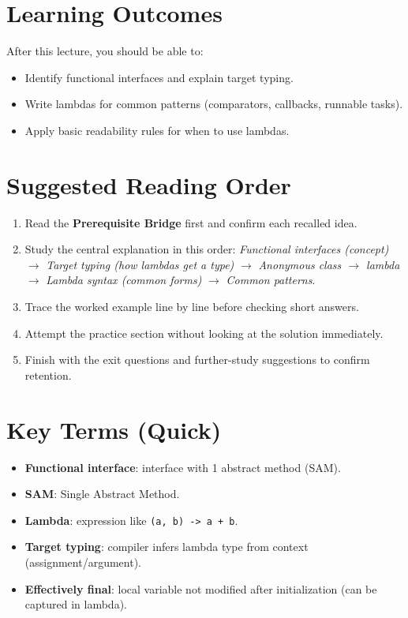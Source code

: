 \documentclass[11pt]{article}
\begin{document}
\section{Learning Outcomes}
After this lecture, you should be able to:
\begin{itemize}
  \item Identify functional interfaces and explain target typing.
  \item Write lambdas for common patterns (comparators, callbacks, runnable tasks).
  \item Apply basic readability rules for when to use lambdas.
\end{itemize}

\section{Suggested Reading Order}
\begin{enumerate}
  \item Read the \textbf{Prerequisite Bridge} first and confirm each recalled idea.
  \item Study the central explanation in this order: \textit{Functional interfaces (concept)} $\rightarrow$ \textit{Target typing (how lambdas get a type)} $\rightarrow$ \textit{\texorpdfstring{Anonymous class $\rightarrow$ lambda}{Anonymous class -> lambda}} $\rightarrow$ \textit{Lambda syntax (common forms)} $\rightarrow$ \textit{Common patterns}.
  \item Trace the worked example line by line before checking short answers.
  \item Attempt the practice section without looking at the solution immediately.
  \item Finish with the exit questions and further-study suggestions to confirm retention.
\end{enumerate}
\notesources{\OOPSUnitIVSources}

\section{Key Terms (Quick)}
\begin{itemize}
  \item \textbf{Functional interface}: interface with 1 abstract method (SAM).
  \item \textbf{SAM}: Single Abstract Method.
  \item \textbf{Lambda}: expression like \texttt{(a, b) -> a + b}.
  \item \textbf{Target typing}: compiler infers lambda type from context (assignment/argument).
  \item \textbf{Effectively final}: local variable not modified after initialization (can be captured in lambda).
\end{itemize}
\end{document}
